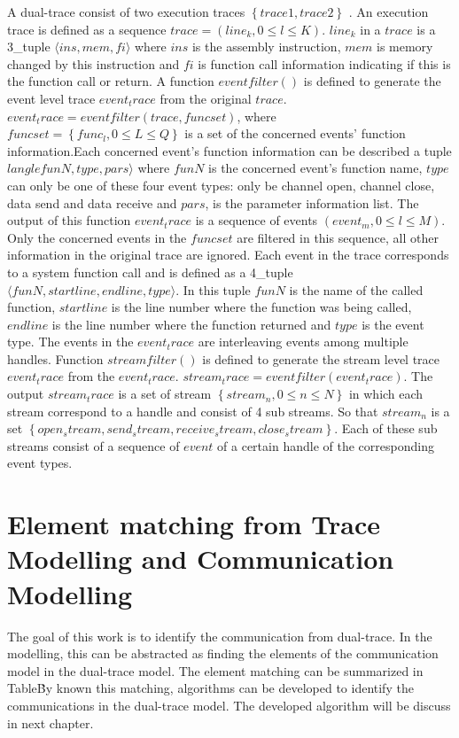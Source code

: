 A dual-trace consist of two execution traces $\left\lbrace trace1, trace2 \right\rbrace $ . An execution trace is defined as a sequence $trace = (line_{k}, 0 \leqslant l \leqslant K)$. $line_{k}$ in a $trace$ is a 3\_tuple $\langle ins, mem, fi \rangle$ where $ins$ is the assembly instruction, $mem$ is memory changed by this instruction and $fi$ is function call information indicating if this is the function call or return. A function $eventfilter \left( \right) $ is defined to generate the event level trace $event_trace$ from the original $trace$. $event_trace = eventfilter\left( trace, funcset\right) $, where $funcset = \left \lbrace func_{l}, 0 \leqslant L \leqslant Q\right\rbrace $ is a set of the concerned events' function information.Each concerned event's function information can be described a tuple $langle funN, type, pars \rangle$ where $funN$ is the concerned event's function name, $type$ can only be one of these four event types: only be channel open, channel close, data send and data receive and $pars$, is the parameter information list. The output of this function $event_trace$ is a sequence of events $(event_{m}, 0 \leqslant l \leqslant M)$. Only the concerned events in the $funcset$ are filtered in this sequence, all other information in the original trace are ignored. Each event in the trace corresponds to a system function call and is defined as a 4\_tuple $\langle funN, startline, endline, type \rangle$. In this tuple $funN$ is the name of the called function, $startline$ is the line number where the function was being called, $endline$ is the line number where the function returned and $type$ is the event type. The events in the $event_trace$ are interleaving events among multiple handles. Function  $streamfilter \left( \right) $ is defined to generate the stream level trace $event_trace$ from the $event_trace$. $stream_trace =  eventfilter\left( event_trace \right) $. The output $stream_trace$ is a set of stream $\left \lbrace stream_{n}, 0 \leqslant n \leqslant N\right\rbrace$ in which each stream correspond to a handle and consist of 4 sub streams. So that $stream_{n} $ is a set  $\left \lbrace open_stream, send_stream, receive_stream, close_stream \right\rbrace $. Each of these sub streams consist of a sequence of $event$ of a certain handle of the corresponding event types.

\section{Element matching from Trace Modelling and Communication Modelling}
The goal of this work is to identify the communication from dual-trace. In the modelling, this can be abstracted as finding the elements of the communication model in the dual-trace model. The element matching can be summarized in Table\. By known this matching, algorithms can be developed to identify the communications in the dual-trace model. The developed algorithm will be discuss in next chapter.




